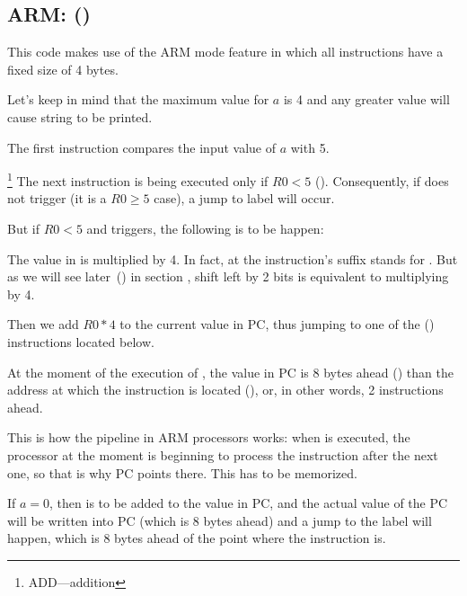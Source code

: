 \subsection{ARM: \OptimizingKeilVI (\ARMMode)}
\label{sec:SwitchARMLot}



This code makes use of the ARM mode feature in which all instructions have a fixed size of 4 bytes.

Let's keep in mind that the maximum value for $a$ is 4 and any greater value will cause
 string to be printed.

The first  instruction compares the input value of $a$ with 5.

\footnote{ADD---addition}
The next  instruction is being executed only if $R0 < 5$ (). 
Consequently, if  does not trigger (it is a $R0 \geq 5$ case), a jump to  label will occur.

But if $R0 < 5$ and  triggers, the following is to be happen:

The value in  is multiplied by 4.
In fact,  at the instruction's suffix stands for .
But as we will see later~() in section \q{\ShiftsSectionName}, 
shift left by 2 bits is equivalent to multiplying by 4.

Then we add $R0*4$ to the current value in \ac{PC}, 
thus jumping to one of the  () instructions located below.

At the moment of the execution of , the value in \ac{PC} is 8 bytes ahead ()
than the address at which the  instruction is located (), 
or, in other words, 2 instructions ahead.


This is how the pipeline in ARM processors works: when  is executed,
the processor at the moment
is beginning to process the instruction after the next one,
so that is why \ac{PC} points there. This has to be memorized.

If $a=0$, then is to be added to the value in \ac{PC},
and the actual value of the \ac{PC} will be written into \ac{PC} (which is 8 bytes ahead)
and a jump to the label  will happen,
which is 8 bytes ahead of the point where the  instruction is.

